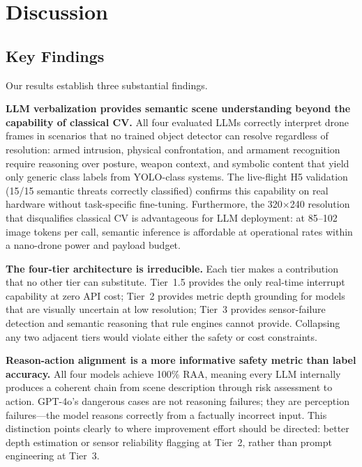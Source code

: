 \documentclass[journal]{IEEEtran}
\begin{document}
\section{Discussion}
\label{sec:discussion}

\subsection{Key Findings}

Our results establish three substantial findings.

\textbf{LLM verbalization provides semantic scene understanding beyond the
capability of classical CV.}
All four evaluated LLMs correctly interpret drone frames in scenarios that
no trained object detector can resolve regardless of resolution: armed
intrusion, physical confrontation, and armament recognition require reasoning
over posture, weapon context, and symbolic content that yield only generic
class labels from YOLO-class systems.
The live-flight H5 validation (15/15 semantic threats correctly classified)
confirms this capability on real hardware without task-specific fine-tuning.
Furthermore, the 320$\times$240 resolution that disqualifies classical CV is
advantageous for LLM deployment: at 85--102 image tokens per call, semantic
inference is affordable at operational rates within a nano-drone power and
payload budget.

\textbf{The four-tier architecture is irreducible.}
Each tier makes a contribution that no other tier can substitute.
Tier~1.5 provides the only real-time interrupt capability at zero API
cost; Tier~2 provides metric depth grounding for models that are
visually uncertain at low resolution; Tier~3 provides sensor-failure
detection and semantic reasoning that rule engines cannot provide.
Collapsing any two adjacent tiers would violate either the safety or
cost constraints.

\textbf{Reason-action alignment is a more informative safety metric than
label accuracy.}
All four models achieve 100\% RAA, meaning every LLM internally produces
a coherent chain from scene description through risk assessment to action.
GPT-4o's dangerous cases are not reasoning failures; they are perception
failures---the model reasons correctly from a factually incorrect input.
This distinction points clearly to where improvement effort should
be directed: better depth estimation or sensor reliability flagging
at Tier~2, rather than prompt engineering at Tier~3.
\end{document}
